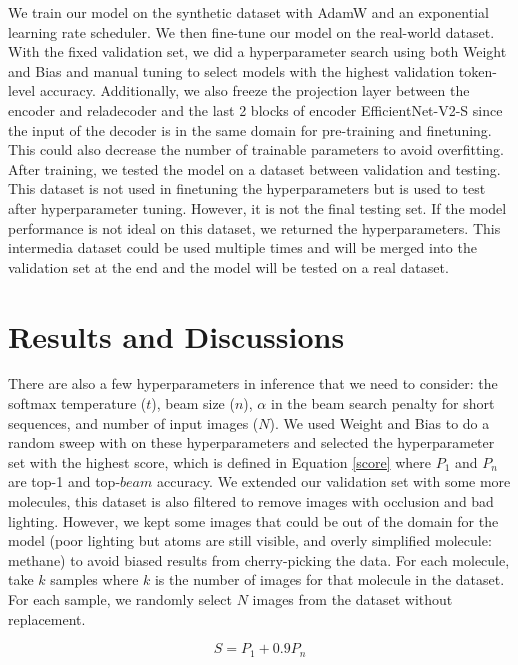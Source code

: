 \documentclass{article}
\begin{document}
We train our model on the synthetic dataset with AdamW \autocite{adamw} and an exponential learning rate scheduler. We then fine-tune our model on the real-world dataset. With the fixed validation set, we did a hyperparameter search using both Weight and Bias \autocite{wandb} and manual tuning to select models with the highest validation token-level accuracy.  
Additionally, we also freeze the projection layer between the encoder and reladecoder and the last 2 blocks of encoder EfficientNet-V2-S since the input of the decoder is in the same domain for pre-training and finetuning. This could also decrease the number of trainable parameters to avoid overfitting. 
After training, we tested the model on a dataset between validation and testing. This dataset is not used in finetuning the hyperparameters but is used to test after hyperparameter tuning. However, it is not the final testing set. If the model performance is not ideal on this dataset, we returned the hyperparameters. This intermedia dataset could be used multiple times and will be merged into the validation set at the end and the model will be tested on a real dataset.
\section{Results and Discussions} 
There are also a few hyperparameters in inference that we need to consider: the softmax temperature ($t$), beam size ($n$), $\alpha$ in the beam search penalty for short sequences, and number of input images ($N$). We used Weight and Bias \cite{wandb} to do a random sweep with on these hyperparameters and selected the hyperparameter set with the highest score, which is defined in Equation \ref{score} where $P_{1}$ and $P_{n}$ are top-1 and top-$beam$ accuracy. We extended our validation set with some more molecules, this dataset is also filtered to remove images with occlusion and bad lighting. However, we kept some images that could be out of the domain for the model (poor lighting but atoms are still visible, and overly simplified molecule: methane) to avoid biased results from cherry-picking the data. For each molecule, take $k$ samples where $k$ is the number of images for that molecule in the dataset. For each sample, we randomly select $N$ images from the dataset without replacement. 


\begin{equation}
S = P_{1} + 0.9P_{n}
\label{score}
\end{equation}
\end{document}
